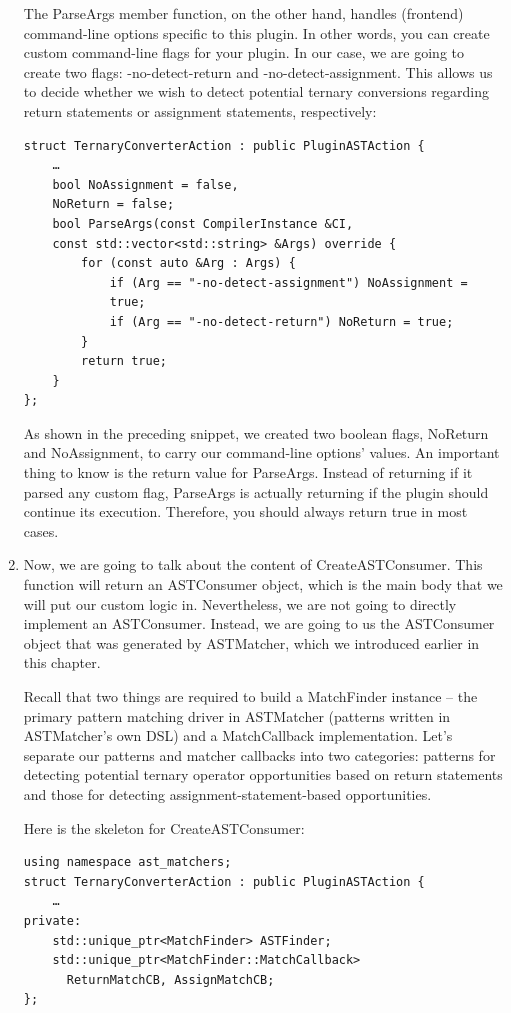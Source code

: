 \begin{enumerate}
The ParseArgs member function, on the other hand, handles (frontend) command-line options specific to this plugin. In other words, you can create custom command-line flags for your plugin. In our case, we are going to create two flags: -no-detect-return and -no-detect-assignment. This allows us to decide whether we wish to detect potential ternary conversions regarding return statements or assignment statements, respectively:

\begin{lstlisting}[style=styleCXX]
struct TernaryConverterAction : public PluginASTAction {
	…
	bool NoAssignment = false,
	NoReturn = false;
	bool ParseArgs(const CompilerInstance &CI,
	const std::vector<std::string> &Args) override {
		for (const auto &Arg : Args) {
			if (Arg == "-no-detect-assignment") NoAssignment =
			true;
			if (Arg == "-no-detect-return") NoReturn = true;
		}
	    return true;
    }
};
\end{lstlisting}

As shown in the preceding snippet, we created two boolean flags, NoReturn and NoAssignment, to carry our command-line options' values. An important thing to know is the return value for ParseArgs. Instead of returning if it parsed any custom flag, ParseArgs is actually returning if the plugin should continue its execution. Therefore, you should always return true in most cases.

\item Now, we are going to talk about the content of CreateASTConsumer. This function will return an ASTConsumer object, which is the main body that we will put our custom logic in. Nevertheless, we are not going to directly implement an ASTConsumer. Instead, we are going to us the ASTConsumer object that was generated by ASTMatcher, which we introduced earlier in this chapter.

Recall that two things are required to build a MatchFinder instance – the primary pattern matching driver in ASTMatcher (patterns written in ASTMatcher's own DSL) and a MatchCallback implementation. Let's separate our patterns and matcher callbacks into two categories: patterns for detecting potential ternary operator opportunities based on return statements and those for detecting assignment-statement-based opportunities.

Here is the skeleton for CreateASTConsumer:

\begin{lstlisting}[style=styleCXX]
using namespace ast_matchers;
struct TernaryConverterAction : public PluginASTAction {
	…
private:
	std::unique_ptr<MatchFinder> ASTFinder;
	std::unique_ptr<MatchFinder::MatchCallback>
	  ReturnMatchCB, AssignMatchCB;
};


\end{lstlisting}
\end{enumerate}
